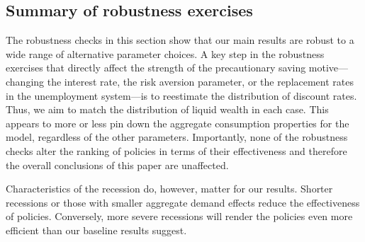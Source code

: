 \documentclass{econsocart}
\begin{document}
%
%

\hypertarget{summary-of-robustness-exercises}{}\par\subsection*{Summary of robustness exercises}
\whenintegrated{\label{sec:robust_summary}} %

The robustness checks in this section show that our main results are robust to a wide range of alternative parameter choices.
A key step in the robustness exercises that directly affect the strength of the precautionary saving motive---changing the interest rate, the risk aversion parameter, or the replacement rates in the unemployment system---is to reestimate the distribution of discount rates.
Thus, we aim to match the distribution of liquid wealth in each case.
This appears to more or less pin down the aggregate consumption properties for the model, regardless of the other parameters.
Importantly, none of the robustness checks alter the ranking of policies in terms of their effectiveness and therefore the overall conclusions of this paper are unaffected.

Characteristics of the recession do, however, matter for our results.
Shorter recessions or those with smaller aggregate demand effects reduce the effectiveness of policies.
Conversely, more severe recessions will render the policies even more efficient than our baseline results suggest.

\smartbib
\end{document}
